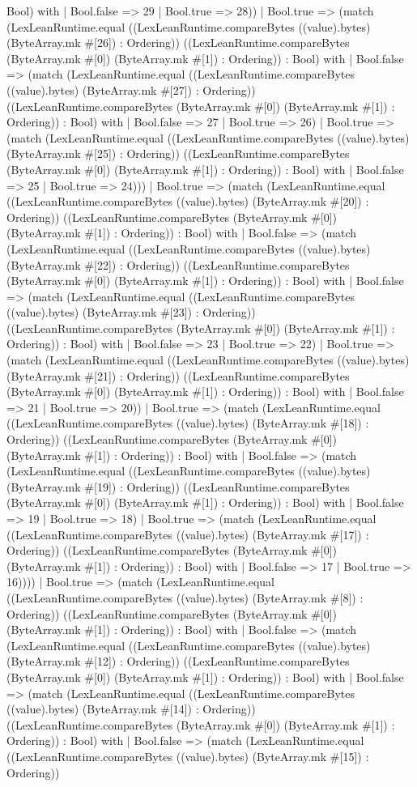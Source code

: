 \documentclass[11pt]{article}
\begin{document}
Bool) with | Bool.false => 29 | Bool.true => 28)) | Bool.true => (match (LexLeanRuntime.equal ((LexLeanRuntime.compareBytes ((value).bytes) (ByteArray.mk \#[26]) : Ordering)) ((LexLeanRuntime.compareBytes (ByteArray.mk \#[0]) (ByteArray.mk \#[1]) : Ordering)) : Bool) with | Bool.false => (match (LexLeanRuntime.equal ((LexLeanRuntime.compareBytes ((value).bytes) (ByteArray.mk \#[27]) : Ordering)) ((LexLeanRuntime.compareBytes (ByteArray.mk \#[0]) (ByteArray.mk \#[1]) : Ordering)) : Bool) with | Bool.false => 27 | Bool.true => 26) | Bool.true => (match (LexLeanRuntime.equal ((LexLeanRuntime.compareBytes ((value).bytes) (ByteArray.mk \#[25]) : Ordering)) ((LexLeanRuntime.compareBytes (ByteArray.mk \#[0]) (ByteArray.mk \#[1]) : Ordering)) : Bool) with | Bool.false => 25 | Bool.true => 24))) | Bool.true => (match (LexLeanRuntime.equal ((LexLeanRuntime.compareBytes ((value).bytes) (ByteArray.mk \#[20]) : Ordering)) ((LexLeanRuntime.compareBytes (ByteArray.mk \#[0]) (ByteArray.mk \#[1]) : Ordering)) : Bool) with | Bool.false => (match (LexLeanRuntime.equal ((LexLeanRuntime.compareBytes ((value).bytes) (ByteArray.mk \#[22]) : Ordering)) ((LexLeanRuntime.compareBytes (ByteArray.mk \#[0]) (ByteArray.mk \#[1]) : Ordering)) : Bool) with | Bool.false => (match (LexLeanRuntime.equal ((LexLeanRuntime.compareBytes ((value).bytes) (ByteArray.mk \#[23]) : Ordering)) ((LexLeanRuntime.compareBytes (ByteArray.mk \#[0]) (ByteArray.mk \#[1]) : Ordering)) : Bool) with | Bool.false => 23 | Bool.true => 22) | Bool.true => (match (LexLeanRuntime.equal ((LexLeanRuntime.compareBytes ((value).bytes) (ByteArray.mk \#[21]) : Ordering)) ((LexLeanRuntime.compareBytes (ByteArray.mk \#[0]) (ByteArray.mk \#[1]) : Ordering)) : Bool) with | Bool.false => 21 | Bool.true => 20)) | Bool.true => (match (LexLeanRuntime.equal ((LexLeanRuntime.compareBytes ((value).bytes) (ByteArray.mk \#[18]) : Ordering)) ((LexLeanRuntime.compareBytes (ByteArray.mk \#[0]) (ByteArray.mk \#[1]) : Ordering)) : Bool) with | Bool.false => (match (LexLeanRuntime.equal ((LexLeanRuntime.compareBytes ((value).bytes) (ByteArray.mk \#[19]) : Ordering)) ((LexLeanRuntime.compareBytes (ByteArray.mk \#[0]) (ByteArray.mk \#[1]) : Ordering)) : Bool) with | Bool.false => 19 | Bool.true => 18) | Bool.true => (match (LexLeanRuntime.equal ((LexLeanRuntime.compareBytes ((value).bytes) (ByteArray.mk \#[17]) : Ordering)) ((LexLeanRuntime.compareBytes (ByteArray.mk \#[0]) (ByteArray.mk \#[1]) : Ordering)) : Bool) with | Bool.false => 17 | Bool.true => 16)))) | Bool.true => (match (LexLeanRuntime.equal ((LexLeanRuntime.compareBytes ((value).bytes) (ByteArray.mk \#[8]) : Ordering)) ((LexLeanRuntime.compareBytes (ByteArray.mk \#[0]) (ByteArray.mk \#[1]) : Ordering)) : Bool) with | Bool.false => (match (LexLeanRuntime.equal ((LexLeanRuntime.compareBytes ((value).bytes) (ByteArray.mk \#[12]) : Ordering)) ((LexLeanRuntime.compareBytes (ByteArray.mk \#[0]) (ByteArray.mk \#[1]) : Ordering)) : Bool) with | Bool.false => (match (LexLeanRuntime.equal ((LexLeanRuntime.compareBytes ((value).bytes) (ByteArray.mk \#[14]) : Ordering)) ((LexLeanRuntime.compareBytes (ByteArray.mk \#[0]) (ByteArray.mk \#[1]) : Ordering)) : Bool) with | Bool.false => (match (LexLeanRuntime.equal ((LexLeanRuntime.compareBytes ((value).bytes) (ByteArray.mk \#[15]) : Ordering)) 
\end{document}
